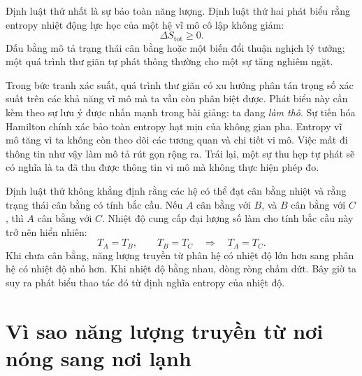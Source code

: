 Định luật thứ nhất là sự bảo toàn năng lượng. Định luật thứ hai phát biểu
rằng entropy nhiệt động lực học của một hệ vĩ mô cô lập không giảm:
\begin{equation}
 \Delta S_{\mathrm{tot}}\geq0.
 \label{eq:sm3-second-law}
\end{equation}
Dấu bằng mô tả trạng thái cân bằng hoặc một biến đổi thuận nghịch lý tưởng;
một quá trình thư giãn tự phát thông thường cho một sự tăng nghiêm ngặt.

Trong bức tranh xác suất, quá trình thư giãn có xu hướng phân tán trọng số
xác suất trên các khả năng vĩ mô mà ta vẫn còn phân biệt được. Phát biểu này
cần kèm theo sự lưu ý được nhấn mạnh trong bài giảng: ta đang \emph{làm thô}.
Sự tiến hóa Hamilton chính xác bảo toàn entropy hạt mịn của không gian pha.
Entropy vĩ mô tăng vì ta không còn theo dõi các tương quan và chi tiết vi mô.
Việc mất đi thông tin như vậy làm mô tả rút gọn rộng ra. Trái lại, một sự thu
hẹp tự phát sẽ có nghĩa là ta đã thu được thông tin vi mô mà không thực hiện
phép đo.

Định luật thứ không khẳng định rằng các hệ có thể đạt cân bằng nhiệt và rằng
trạng thái cân bằng có tính bắc cầu. Nếu \(A\) cân bằng với \(B\), và \(B\)
cân bằng với \(C\), thì \(A\) cân bằng với \(C\). Nhiệt độ cung cấp đại
lượng số làm cho tính bắc cầu này trở nên hiển nhiên:
\[
 T_A=T_B,\qquad T_B=T_C
 \quad\Longrightarrow\quad
 T_A=T_C.
\]
Khi chưa cân bằng, năng lượng truyền từ phân hệ có nhiệt độ lớn hơn sang
phân hệ có nhiệt độ nhỏ hơn. Khi nhiệt độ bằng nhau, dòng ròng chấm dứt. Bây
giờ ta suy ra phát biểu thao tác đó từ định nghĩa entropy của nhiệt độ.

\section{Vì sao năng lượng truyền từ nơi nóng sang nơi lạnh}

